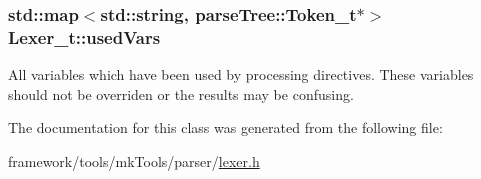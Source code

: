 \subsubsection[{\texorpdfstring{used\+Vars}{usedVars}}]{\setlength{\rightskip}{0pt plus 5cm}std\+::map$<$std\+::string, {\bf parse\+Tree\+::\+Token\+\_\+t}$\ast$$>$ Lexer\+\_\+t\+::used\+Vars\hspace{0.3cm}{\ttfamily [private]}}\hypertarget{class_lexer__t_a4593954598325485560ea440036c8f65}{}\label{class_lexer__t_a4593954598325485560ea440036c8f65}
All variables which have been used by processing directives. These variables should not be overriden or the results may be confusing. 

The documentation for this class was generated from the following file\+:\begin{DoxyCompactItemize}
\item 
framework/tools/mk\+Tools/parser/\hyperlink{lexer_8h}{lexer.\+h}\end{DoxyCompactItemize}
